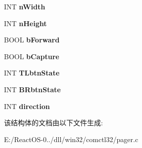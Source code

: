 \begin{DoxyCompactItemize}
I\+NT {\bfseries n\+Width}
\item 
\mbox{\label{struct_p_a_g_e_r___i_n_f_o_a9e7731efde86f48b6876f7a010468b48}} 
I\+NT {\bfseries n\+Height}
\item 
\mbox{\label{struct_p_a_g_e_r___i_n_f_o_a64d84d4df39484083b67bacb80717277}} 
B\+O\+OL {\bfseries b\+Forward}
\item 
\mbox{\label{struct_p_a_g_e_r___i_n_f_o_a6b0994c4f87b5b8f1d84e3d902db8a2c}} 
B\+O\+OL {\bfseries b\+Capture}
\item 
\mbox{\label{struct_p_a_g_e_r___i_n_f_o_a463f1b6acf748a1ec8c299bb67ea9a3e}} 
I\+NT {\bfseries T\+Lbtn\+State}
\item 
\mbox{\label{struct_p_a_g_e_r___i_n_f_o_aa58826478d101397ed698e0035ae211b}} 
I\+NT {\bfseries B\+Rbtn\+State}
\item 
\mbox{\label{struct_p_a_g_e_r___i_n_f_o_a701871959927273cdfcc8d544dd230cd}} 
I\+NT {\bfseries direction}
\end{DoxyCompactItemize}


该结构体的文档由以下文件生成\+:\begin{DoxyCompactItemize}
\item 
E\+:/\+React\+O\+S-\/0../dll/win32/comctl32/pager.\+c\end{DoxyCompactItemize}
